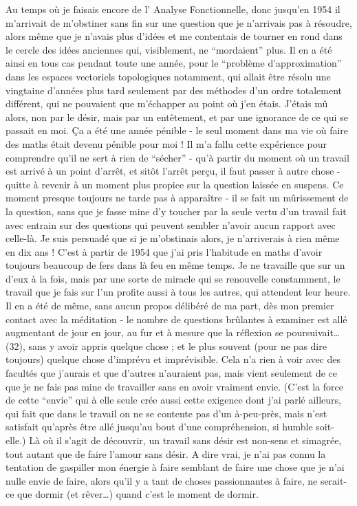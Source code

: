 {Au temps où je faisais encore de l' Analyse Fonctionnelle, donc jusqu'en 1954 il m'arrivait de m'obstiner sans fin sur une question que je n'arrivais pas à résoudre, alors même que je n'avais plus d'idées et me contentais de tourner en rond dans le cercle des idées anciennes qui, visiblement, ne ``mordaient'' plus. Il en a été ainsi en tous cas pendant toute une année, pour le ``problème d'approximation'' dans les espaces vectoriels topologiques notamment, qui allait être résolu une vingtaine d'années plus tard seulement par des méthodes d'un ordre totalement différent, qui ne pouvaient que m'échapper au point où j'en étais. J'étais mû alors, non par le désir, mais par un entêtement, et par une ignorance de ce qui se passait en moi. Ça a été une année pénible - le seul moment dans ma vie où faire des maths était devenu pénible pour moi ! Il m'a fallu cette expérience pour comprendre qu'il ne sert à rien de ``sécher'' - qu'à partir du moment où un travail est arrivé à un point d'arrêt, et sitôt l'arrêt perçu, il faut passer à autre chose - quitte à revenir à un moment plus propice sur la question laissée en suspens. Ce moment presque toujours ne tarde pas à apparaître - il se fait un mûrissement de la question, sans que je fasse mine d'y toucher par la seule vertu d'un travail fait avec entrain sur des questions qui peuvent sembler n'avoir aucun rapport avec celle-là. Je suis persuadé que si je m'obstinais alors, je n'arriverais à rien même en dix ans ! C'est à partir de 1954 que j'ai pris l'habitude en maths d'avoir toujours beaucoup de fers dans là feu en même temps. Je ne travaille que sur un d'eux à la fois, mais par une sorte de miracle qui se renouvelle constamment, le travail que je fais sur l'un profite aussi à tous les autres, qui attendent leur heure. Il en a été de même, sans aucun propos délibéré de ma part, dès mon premier contact avec la méditation - le nombre de questions brûlantes à examiner est allé augmentant de jour en jour, au fur et à mesure que la réflexion se poursuivait\ldots{}} (32), sans y avoir appris quelque chose ; et le plus souvent (pour ne pas dire toujours) quelque chose d'imprévu et imprévisible. Cela n'a rien à voir avec des facultés que j'aurais et que d'autres n'auraient pas, mais vient seulement de ce que je ne fais pas mine de travailler sans en avoir vraiment envie. (C'est la force de cette ``envie'' qui à elle seule crée aussi cette exigence dont j'ai parlé ailleurs, qui fait que dans le travail on ne se contente pas d'un à-peu-près, mais n'est satisfait qu'après être allé jusqu'au bout d'une compréhension, si humble soit-elle.) Là où il s'agit de découvrir, un travail sans désir est non-sens et simagrée, tout autant que de faire l'amour sans désir. A dire vrai, je n'ai pas connu la tentation de gaspiller mon énergie à faire semblant de faire une chose que je n'ai nulle envie de faire, alors qu'il y a tant de choses passionnantes à faire, ne serait-ce que dormir (et rêver\ldots{}) quand c'est le moment de dormir.

